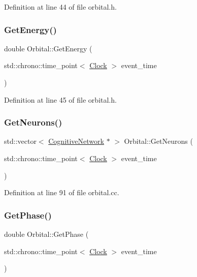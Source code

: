 Definition at line 44 of file orbital.\+h.

\mbox{\label{class_orbital_a6748a8f75bfd255c1a53a5061d4e14e1}} 
\subsubsection{\texorpdfstring{Get\+Energy()}{GetEnergy()}}
{\footnotesize\ttfamily double Orbital\+::\+Get\+Energy (\begin{DoxyParamCaption}\item[{std\+::chrono\+::time\+\_\+point$<$ \mbox{\hyperlink{universe_8h_a0ef8d951d1ca5ab3cfaf7ab4c7a6fd80}{Clock}} $>$}]{event\+\_\+time }\end{DoxyParamCaption})\hspace{0.3cm}{\ttfamily [inline]}}



Definition at line 45 of file orbital.\+h.

\mbox{\label{class_orbital_a7d7e4b7cb0d009a5e7224b6f758d7b6b}} 
\subsubsection{\texorpdfstring{Get\+Neurons()}{GetNeurons()}}
{\footnotesize\ttfamily std\+::vector$<$ \mbox{\hyperlink{class_cognitive_network}{Cognitive\+Network}} $\ast$ $>$ Orbital\+::\+Get\+Neurons (\begin{DoxyParamCaption}\item[{std\+::chrono\+::time\+\_\+point$<$ \mbox{\hyperlink{universe_8h_a0ef8d951d1ca5ab3cfaf7ab4c7a6fd80}{Clock}} $>$}]{event\+\_\+time }\end{DoxyParamCaption})}



Definition at line 91 of file orbital.\+cc.

\mbox{\label{class_orbital_ad891e4a65c01e94c72ad36cda114cc2a}} 
\subsubsection{\texorpdfstring{Get\+Phase()}{GetPhase()}}
{\footnotesize\ttfamily double Orbital\+::\+Get\+Phase (\begin{DoxyParamCaption}\item[{std\+::chrono\+::time\+\_\+point$<$ \mbox{\hyperlink{universe_8h_a0ef8d951d1ca5ab3cfaf7ab4c7a6fd80}{Clock}} $>$}]{event\+\_\+time }\end{DoxyParamCaption})\hspace{0.3cm}{\ttfamily [inline]}}



